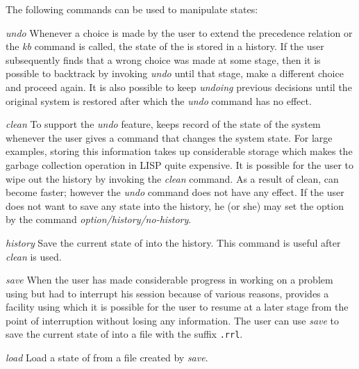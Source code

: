 The following commands can be used to manipulate \RRL states:

\begin{description}
\item{\em undo} Whenever a choice is made by the user to extend
the precedence relation or the {\em kb} command is called, the state of
the \RRL is stored in a history. If the user subsequently finds that a
wrong choice was made at some stage, then it is possible to backtrack
by invoking {\em undo} until that stage, make a different choice and
proceed again. It is also possible to keep {\em undoing} previous
decisions until the original system is restored after which the {\em
undo} command has no effect.

\item{\em clean} To support the {\em undo} feature, \RRL keeps record of
the state of the system whenever the user gives a command that changes
the system state.  For large examples, storing this information takes
up considerable storage which makes the garbage collection operation
in LISP quite
expensive. It is possible for the user to wipe out the history by
invoking the {\em clean} command. As a result of clean, \RRL can become
faster; however the {\em undo} command does not have any effect.
If the user does not want to save any state into the history, 
he (or she) may set
the option by the command {\em option/history/no-history}.

\item{\em history} Save the current state of \RRL into the history.
This command is useful after {\em clean} is used.

\item{\em save} When the user has made considerable progress in working
on a problem using \RRL but had to interrupt his session because of
various reasons, \RRL provides a facility using which it is possible
for the user to resume at a later stage from the point of interruption
without losing any information.  The user can use {\em save} to save
the current state of \RRL into a file with the suffix {\tt .rrl}.

\item{\em load} Load a state of \RRL from a file created by {\em save}.
\end{description}
